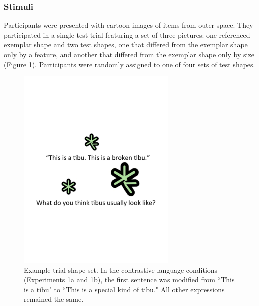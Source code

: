 \documentclass[10pt,letterpaper]{article}
\begin{document}
\subsubsection{Stimuli}

Participants were presented with cartoon images of items from outer space. They participated in a single test trial featuring a set of three pictures: one referenced exemplar shape and two test shapes, one that differed from the exemplar shape only by a feature, and another that differed from the exemplar shape only by size (Figure \ref{fig:demo}).  Participants were randomly assigned to one of four sets of test shapes.  


\begin{figure}[t] 
  \begin{center} 
  \vspace{-1in}
    \includegraphics[width=3in]{figures/demo.pdf} 
   \vspace{-1in}
    \caption{\label{fig:demo} Example trial shape set.  In the contrastive language conditions (Experiments 1a and 1b), the first sentence was modified from ``This is a tibu" to ``This is a special kind of tibu."  All other expressions remained the same. }
  \end{center} 
\end{figure}
	
\end{document}
